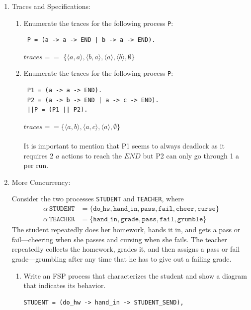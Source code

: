 \documentclass{article}
\begin{document}

\begin{enumerate}

\item Traces and Specifications:

\begin{enumerate}
\item Enumerate the traces for the following process \verb"P":
\begin{verbatim}
 P = (a -> a -> END | b -> a -> END).
\end{verbatim}
$traces == $
$ \{ \langle a, a \rangle, \langle b, a \rangle, \langle a \rangle, \langle b \rangle, \emptyset \} $ \\

\item Enumerate the traces for the following process \verb"P":
\begin{verbatim}
 P1 = (a -> a -> END).
 P2 = (a -> b -> END | a -> c -> END).
 ||P = (P1 || P2).
\end{verbatim}
$traces ==  \{ \langle a, b \rangle, \langle a,c \rangle, \langle a \rangle, \emptyset \} $ \\
\\
It is important to mention that P1 seems to always deadlock as it requires 2 $a$ actions to reach the $END$ but P2 can only go through 1 a per run. \\
\end{enumerate}

\item More Concurrency:

Consider the two processes \texttt{STUDENT} and \texttt{TEACHER}, where
\begin{align*}
    \alpha\ \mathtt{STUDENT} &= \{\mathtt{do\_hw}, \mathtt{hand\_in}, \mathtt{pass}, \mathtt{fail}, \mathtt{cheer}, \mathtt{curse}\} \\
    \alpha\ \mathtt{TEACHER} &= \{\mathtt{hand\_in}, \mathtt{grade}, \mathtt{pass}, \mathtt{fail}, \mathtt{grumble}\}
\end{align*}
The student repeatedly does her homework, hands it in, and gets a pass or fail---cheering when she
passes and cursing when she fails. The teacher repeatedly collects the homework, grades it, and then assigns a pass or
fail grade---grumbling after any time that he has to give out a failing grade.

\begin{enumerate}
\item Write an FSP process that characterizes the student and show a diagram that indicates its
  behavior. \\
\begin{verbatim}
STUDENT = (do_hw -> hand_in -> STUDENT_SEND),


\end{verbatim}
\end{enumerate}
\end{enumerate}
\end{document}
